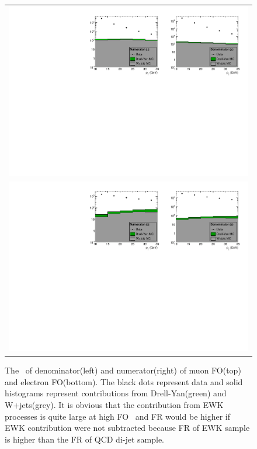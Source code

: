 \begin{figure}[htp] 
\centering 
\begin{tabular}{c} 
\includegraphics[width=1.00\textwidth]{figures/Num_den_pt_Mu.pdf}  \\
\includegraphics[width=1.00\textwidth]{figures/Num_den_pt_Ele.pdf}
\end{tabular} 
\caption{The \pt\ of denominator(left) and numerator(right) of 
muon FO(top) and electron FO(bottom). The black dots represent 
data and solid histograms represent contributions from Drell-Yan(green) 
and W+jets(grey). It is obvious 
that the contribution from EWK processes is quite large at high FO \pt\ 
and FR would be higher if EWK contribution were not subtracted
because FR of EWK sample is higher than the FR of QCD di-jet sample.  }
\label{fig:Num_Den_pt_EWK} 
\end{figure} 

